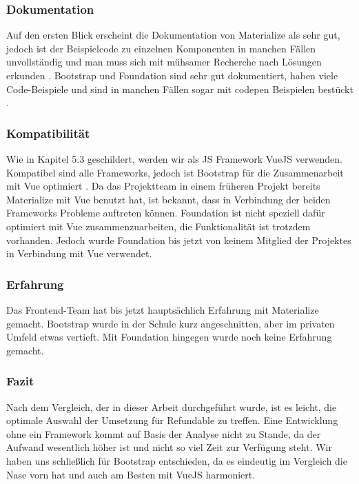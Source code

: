 \subsubsection{Dokumentation}
Auf den ersten Blick erscheint die Dokumentation von Materialize als sehr gut, jedoch ist der Beispielcode zu einzelnen Komponenten in manchen Fällen unvollständig und man muss sich mit mühsamer Recherche nach Lösungen erkunden \cite{WebDocMaterialize}. Bootstrap und Foundation sind sehr gut dokumentiert, haben viele Code-Beispiele und sind in manchen Fällen sogar mit \Gls{codepen} Beispielen bestückt \cite{bootstrap-docu, foundation-docu}.

\subsubsection{Kompatibilität}
Wie in Kapitel 5.3 geschildert, werden wir als JS Framework VueJS verwenden. Kompatibel sind alle Frameworks, jedoch ist Bootstrap für die Zusammenarbeit mit Vue optimiert \cite{bootstrap-docu}. Da das Projektteam in einem früheren Projekt bereits Materialize mit Vue benutzt hat, ist bekannt, dass in Verbindung der beiden Frameworks Probleme auftreten können. Foundation ist nicht speziell dafür optimiert mit Vue zusammenzuarbeiten, die Funktionalität ist trotzdem vorhanden. Jedoch wurde Foundation bis jetzt von keinem Mitglied der Projektes in Verbindung mit Vue verwendet.

\subsubsection{Erfahrung}
Das Frontend-Team hat bis jetzt hauptsächlich Erfahrung mit Materialize gemacht. Bootstrap wurde in der Schule kurz angeschnitten, aber im privaten Umfeld etwas vertieft. Mit Foundation hingegen wurde noch keine Erfahrung gemacht.

\subsubsection{Fazit}
Nach dem Vergleich, der in dieser Arbeit durchgeführt wurde, ist es leicht, die optimale Auswahl der Umsetzung für Refundable zu treffen. Eine Entwicklung ohne ein Framework kommt auf Basis der Analyse nicht zu Stande, da der Aufwand wesentlich höher ist und nicht so viel Zeit zur Verfügung steht. Wir haben uns schließlich für Bootstrap entschieden, da es eindeutig im Vergleich die Nase vorn hat und auch am Besten mit VueJS harmoniert.

